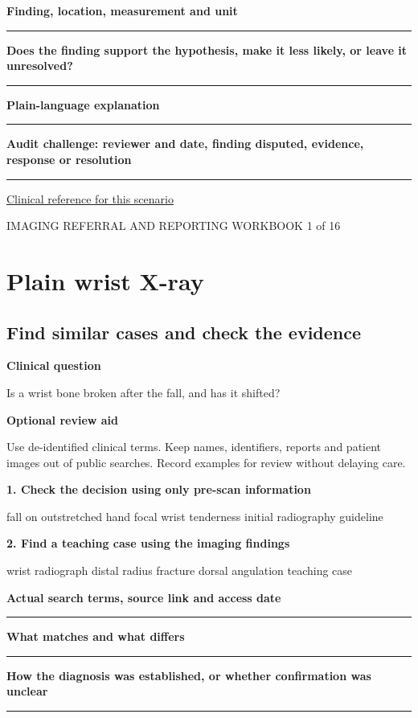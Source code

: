 \documentclass[11pt,a4paper]{article}
\newcommand{\record}[1]{\textbf{#1}\par\vspace{0.55\baselineskip}\hrule\vspace{0.35\baselineskip}}
\begin{document}
\record{Finding, location, measurement and unit}

\record{Does the finding support the hypothesis, make it less likely, or leave it unresolved?}

\record{Plain-language explanation}

\record{Audit challenge: reviewer and date, finding disputed, evidence, response or resolution}

\small\href{https://www.radiologyinfo.org/en/info/acs-acute-hand-and-wrist-trauma}{Clinical reference for this scenario}

\normalsize

\newpage

{\small IMAGING REFERRAL AND REPORTING WORKBOOK \hfill 1 of 16}

\section*{Plain wrist X-ray}

\subsection*{Find similar cases and check the evidence}

\textbf{Clinical question}\par Is a wrist bone broken after the fall, and has it shifted?\par

\textbf{Optional review aid}\par Use de-identified clinical terms. Keep names, identifiers, reports and patient images out of public searches. Record examples for review without delaying care.\par

\textbf{1. Check the decision using only pre-scan information}\par fall on outstretched hand focal wrist tenderness initial radiography guideline\par

\textbf{2. Find a teaching case using the imaging findings}\par wrist radiograph distal radius fracture dorsal angulation teaching case\par

\record{Actual search terms, source link and access date}

\record{What matches and what differs}

\record{How the diagnosis was established, or whether confirmation was unclear}
\end{document}
